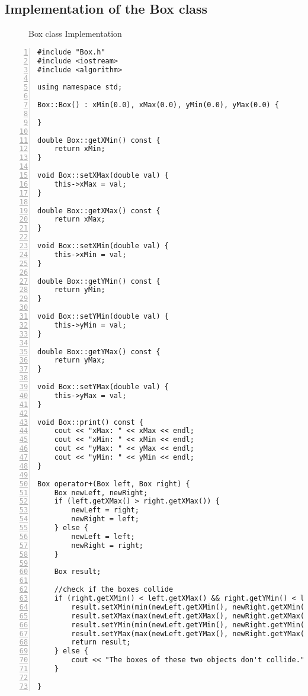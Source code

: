 \documentclass{article}
\begin{document}
\subsection{Implementation of the Box class}
\begin{figure}
\scriptsize{\caption{Box class Implementation}}
\end{figure}
\begin{lstlisting}[basicstyle=\footnotesize\ttfamily, numbers=left, stepnumber=1, numberstyle = \normalsize]
#include "Box.h"
#include <iostream>
#include <algorithm>

using namespace std;

Box::Box() : xMin(0.0), xMax(0.0), yMin(0.0), yMax(0.0) {

}

double Box::getXMin() const {
	return xMin;
}

void Box::setXMax(double val) {
	this->xMax = val;
}

double Box::getXMax() const {
	return xMax;
}

void Box::setXMin(double val) {
	this->xMin = val; 
}

double Box::getYMin() const {
	return yMin;
}

void Box::setYMin(double val) {
	this->yMin = val;
}

double Box::getYMax() const {
	return yMax;
}

void Box::setYMax(double val) {
	this->yMax = val; 
}

void Box::print() const {
	cout << "xMax: " << xMax << endl; 
	cout << "xMin: " << xMin << endl;
	cout << "yMax: " << yMax << endl;
	cout << "yMin: " << yMin << endl;
}

Box operator+(Box left, Box right) {
	Box newLeft, newRight;
	if (left.getXMax() > right.getXMax()) {
		newLeft = right;
		newRight = left;
	} else {
		newLeft = left;
		newRight = right;
	}

	Box result; 

	//check if the boxes collide
	if (right.getXMin() < left.getXMax() && right.getYMin() < left.getYMax()) {
		result.setXMin(min(newLeft.getXMin(), newRight.getXMin()));
		result.setXMax(max(newLeft.getXMax(), newRight.getXMax()));
		result.setYMin(min(newLeft.getYMin(), newRight.getYMin()));
		result.setYMax(max(newLeft.getYMax(), newRight.getYMax()));
		return result;
	} else {
		cout << "The boxes of these two objects don't collide." << '\n';
	}
	 
}
\end{lstlisting}
\end{document}
